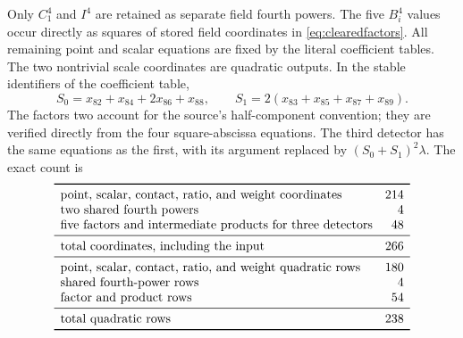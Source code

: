 \documentclass[11pt,a4paper]{article}
\begin{document}
Only $C_1^4$ and $I^4$ are retained as separate field fourth powers.
The five $B_i^4$ values occur directly as squares of stored field
coordinates in \eqref{eq:clearedfactors}. All remaining point and
scalar equations are fixed by the literal coefficient tables.
The two nontrivial scale coordinates are quadratic outputs. In the
stable identifiers of the coefficient table,
\[
 S_0=x_{82}+x_{84}+2x_{86}+x_{88},\qquad
 S_1=2(x_{83}+x_{85}+x_{87}+x_{89}).
\]
The factors two account for the source's half-component convention;
they are verified directly from the four square-abscissa equations.
The third detector has the same equations as the first, with its
argument replaced by $(S_0+S_1)^2\lambda$.
The exact count is
\[
\begin{array}{lr}\toprule
\text{point, scalar, contact, ratio, and weight coordinates}&214\\
\text{two shared fourth powers}&4\\
\text{five factors and intermediate products for three detectors}&48\\\midrule
\text{total coordinates, including the input}&266\\\midrule
\text{point, scalar, contact, ratio, and weight quadratic rows}&180\\
\text{shared fourth-power rows}&4\\
\text{factor and product rows}&54\\\midrule
\text{total quadratic rows}&238\\\bottomrule
\end{array}
\]
\end{document}

